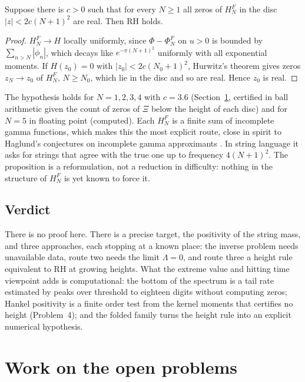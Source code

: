 \begin{proposition}\label{ev:prop:reduction}
Suppose there is $c>0$ such that for every $N\ge1$ all zeros of $H^F_N$ in the disc $|z|<2c(N+1)^2$ are real. Then RH holds.
\end{proposition}

\begin{proof}
$H^F_N\to H$ locally uniformly, since $\Phi-\Phi^F_N$ on $u>0$ is bounded by $\sum_{n>N}|\phi_n|$, which decays like $e^{-\pi(N+1)^2}$ uniformly with all exponential moments. If $H(z_0)=0$ with $|z_0|<2c(N_0+1)^2$, Hurwitz's theorem gives zeros $z_N\to z_0$ of $H^F_N$, $N\ge N_0$, which lie in the disc and so are real. Hence $z_0$ is real.
\end{proof}

The hypothesis holds for $N=1,2,3,4$ with $c=3.6$ (Section~\ref{ev:sec:work}, certified in ball arithmetic given the count of zeros of $\Xi$ below the height of each disc) and for $N=5$ in floating point (computed). Each $H^F_N$ is a finite sum of incomplete gamma functions, which makes this the most explicit route, close in spirit to Haglund's conjectures on incomplete gamma approximants \cite{Haglund09}. %
In string language it asks for strings that agree with the true one up to frequency $4(N+1)^2$. The proposition is a reformulation, not a reduction in difficulty: nothing in the structure of $H^F_N$ is yet known to force it.

\subsection{Verdict}
There is no proof here. There is a precise target, the positivity of the string mass, and three approaches, each stopping at a known place: the inverse problem needs unavailable data, route two needs the limit $\Lambda=0$, and route three a height rule equivalent to RH at growing heights. What the extreme value and hitting time viewpoint adds is computational: the bottom of the spectrum is a tail rate estimated by peaks over threshold to eighteen digits without computing zeros; Hankel positivity is a finite order test from the kernel moments that certifies no height (Problem~4); and the folded family turns the height rule into an explicit numerical hypothesis.

\section{Work on the open problems}\label{ev:sec:work}\label{ev:sec:round2}

